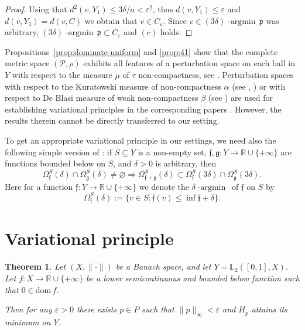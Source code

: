 \documentclass[12pt,leqno]{article}
\newtheorem{thm}{Theorem}[section]
\theoremstyle{definition}
\theoremstyle{remark}
\def\Ri{\mathbb{R}\cup\{+\infty\}}
\def\eps{\varepsilon}
\def\dom{\mathrm{dom\,}}
\def\L{\mathbb{L}}
\DeclareMathOperator*{\argmin}{-argmin\,}
\begin{document}
\begin{proof}
 Using that
       $d^2(v,Y_1) \le 3\delta/a < \varepsilon^2$,   thus $ d(v,Y_1) \le  \varepsilon $ and  $d(v,Y_1)=d(v,C)$  we obtain that $v\in C_\varepsilon$.
        Since $v \in (3\delta)\argmin \mathfrak{p}$ was arbitrary,  $
            (3\delta)\argmin  \mathfrak{p} \subset C_\varepsilon $
        and $(c)$ holds.
    \end{proof}

    Propositions~\ref{prop:dominate-uniform} and \ref{prop:41} show that the complete metric space $(\mathcal{P},\rho)$ exhibits  all features of a perturbation space on each ball in $Y$ with respect to the measure $\mu$ of $\tau$ non-compactness, see \cite[Definition 2]{Orlitz}. Perturbation spaces with respect to the Kuratowski measure of non-compactness $\alpha$ (see \cite[Definition 4.2]{iz_integr_funct}, \cite[Definition 2]{Orlitz}) or with respect to De Blasi measure of weak non-compactness $\beta$ (see \cite[Definition 3.1]{iv_var_integr}) are used for establishing variational principles in the corresponding papers \cite{iz_integr_funct,Orlitz,iv_var_integr}. However, the results therein cannot be directly transferred to our setting.

To get an appropriate variational principle in our settings, we need   also  the following simple version of \cite[Lemma 2.3]{iv_var_integr}: if  $S\subseteq Y$ is a non-empty set,  $\mathfrak{f},\mathfrak{g}:Y\to \Ri$ are   functions bounded below on $S$, and $\delta >0$ is arbitrary, then
\begin{equation}\label{eq:new-lema4}
 \Omega_{\mathfrak{f}}^S(\delta)\cap \Omega_{\mathfrak{g}}^S (\delta)\neq \varnothing \Rightarrow \Omega_{\mathfrak{f}+\mathfrak{g}}^S (\delta)\subset \Omega_{\mathfrak{f}}^S(3\delta)\cap \Omega_{\mathfrak{g}}^S (3\delta).
 \end{equation}
Here for a function $\mathfrak{f} :Y\to \Ri$ we denote the $\delta\argmin$ of $\mathfrak{f}$ on $S$ by
 \[
 \Omega_{\mathfrak{f}}^S(\delta):=\{ v\in S: \mathfrak{f}(v)\le \inf \mathfrak{f}+\delta \}.
 \]

\section{Variational principle}\label{sec:VP}


\begin{thm}\label{VP}
  Let $(X,\|\cdot\|)$ be a Banach space, and let $Y=\L_2([0,1],X)$. Let   $f:X\to \Ri$ be a   lower semicontinuous and bounded below  function such that $0\in \dom f$.

  Then for any $\eps >0$ there exists $p\in P$ such that $ \|p\|_\infty < \eps$ and
  $H_p$   attains its minimum on $Y$.
\end{thm}
\end{document}
